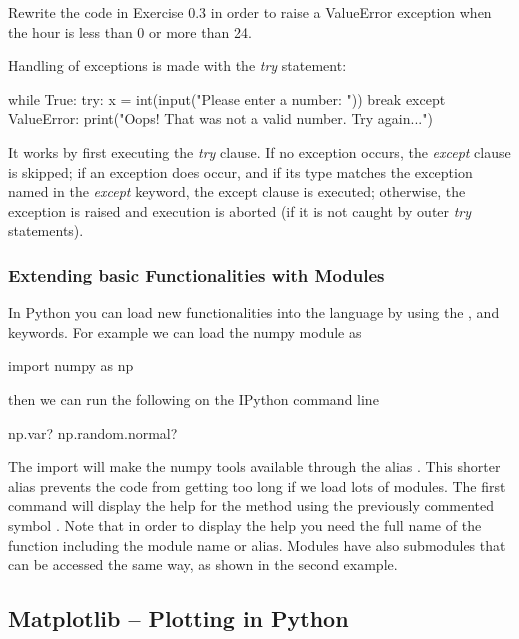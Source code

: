 \begin{exercise}
Rewrite the code in Exercise 0.3 in order to raise a ValueError exception when
the hour is less than 0 or more than 24.  \end{exercise}

Handling of exceptions is made with the \textit{try} statement:

\begin{python}
while True:
    try:
        x = int(input("Please enter a number: "))
        break
    except ValueError:
        print("Oops! That was not a valid number. Try again...")
\end{python}

It works by first executing the \textit{try} clause. If no exception occurs,
the \textit{except} clause is skipped; if an exception does occur, and if its
type matches the exception named in the \textit{except} keyword, the except
clause is executed; otherwise, the exception is raised and execution is aborted
(if it is not caught by outer \textit{try} statements).


\subsubsection{Extending basic Functionalities with Modules}

In Python you can load new functionalities into the language by using the
,  and  keywords. For example we can load the
numpy module as

\begin{python}
import numpy as np
\end{python}

then we can run the following on the IPython command line

\begin{python}
np.var?
np.random.normal?
\end{python}

The import  will make the numpy tools available through the alias .
This shorter alias prevents the code from getting too long if we load lots of
modules. The first command will display the help for the method
 using the previously commented symbol . Note that in
order to display the help you need the full name of the function including the
module name or alias. Modules have also submodules that can be accessed the
same way, as shown in the second example.


\subsection{Matplotlib -- Plotting in Python}

